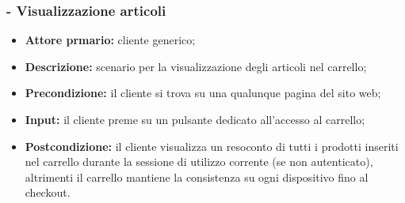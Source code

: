 \stepsubUserCase
\subsubsection{ - Visualizzazione articoli}
\begin{itemize}
    \item \textbf{Attore prmario:} cliente generico;
    \item \textbf{Descrizione:} scenario per la visualizzazione degli articoli nel carrello;
    \item \textbf{Precondizione:} il cliente si trova su una qualunque pagina del sito web;
    \item \textbf{Input:} il cliente preme su un pulsante dedicato all'accesso al carrello;
    \item \textbf{Postcondizione:} il cliente visualizza un resoconto di tutti i prodotti inseriti nel carrello durante
          la sessione di utilizzo corrente (se non autenticato), altrimenti il carrello mantiene la consistenza
          su ogni dispositivo fino al checkout.
\end{itemize}

\stepsubUserCase
